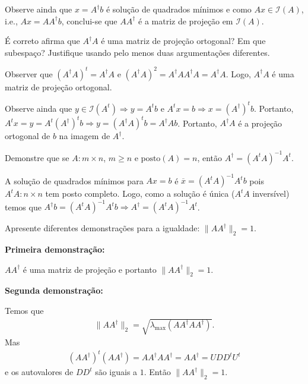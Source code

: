 \documentclass[a4paper,12pt, leqno, answers]{exam}
\begin{document}
\begin{questions}
\begin{solution}
        Observe ainda que $x = A^\dagger b$ \'{e} solu\c{c}\~{a}o de quadrados m\'{i}nimos e como $A x \in \mathcal{I}(A)$, i.e., $A x = A A^\dagger b$, conclui-se que $A A^\dagger$ \'{e} a matriz de proje\c{c}\~{a}o em $\mathcal{I}(A)$.
    \end{solution}

    \question \'{E} correto afirma que $A^\dagger A$ \'{e} uma matriz de proje\c{c}\~{a}o ortogonal? Em que subespa\c{c}o? Justifique usando pelo menos duas argumenta\c{c}\~{o}es diferentes.
    \begin{solution}
        Observer que $\left( A^\dagger A \right)^t = A^\dagger A$ e $\left( A^\dagger A \right)^2 = A^\dagger A A^\dagger A = A^\dagger A$. Logo, $A^\dagger A$ \'{e} uma matriz de proje\c{c}\~{a}o ortogonal.

        Observe ainda que $y \in \mathcal{I}(A^t) \Rightarrow y = A^t b$ e $A^t x = b \Rightarrow x = \left( A^\dagger \right)^t b$. Portanto, $A^t x = y = A^t \left( A^\dagger \right)^t b \Rightarrow y = \left( A^\dagger A \right)^t b = A^\dagger A b$. Portanto, $A^\dagger A$ \'{e} a proje\c{c}\~{a}o ortogonal de $b$ na imagem de $A^\dagger$.
    \end{solution}

    \question Demonstre que se $A : m \times n$, $m \geq n$ e $\textrm{posto}(A) = n$, ent\~{a}o $A^\dagger = (A^t A)^{-1} A^t$.
    \begin{solution}
        A solu\c{c}\~{a}o de quadrados m\'{i}nimos para $A x = b$ \'{e} $\overline{x} = \left( A^t A \right)^{-1} A^t b$ pois $A^t A : n \times n$ tem posto completo. Logo, como a solu\c{c}\~{a}o \'{e} \'{u}nica ($A^t A$ invers\'{i}vel) temos que $A^\dagger b = \left( A^t A \right)^{-1} A^t b \Rightarrow A^\dagger = \left( A^t A \right)^{-1} A^t$.
    \end{solution}

    \question Apresente diferentes demonstra\c{c}\~{o}es para a igualdade: $\| A A^\dagger \|_2 = 1$.
    \begin{solution}
        \textbf{Primeira demonstra\c{c}\~{a}o:}

        $A A^\dagger$ \'{e} uma matriz de proje\c{c}\~{a}o e portanto $\| A A^\dagger \|_2 = 1$.

        \textbf{Segunda demonstra\c{c}\~{a}o:}

        Temos que
        \begin{align*}
            \| A A^\dagger \|_2 = \sqrt{\lambda_{\max}(A A^\dagger A A^\dagger)}.
        \end{align*}
        Mas
        \begin{align*}
            \left( A A^\dagger \right)^t \left( A A^\dagger \right) = A A^\dagger A A^\dagger = A A^\dagger = U D D^t U^t
        \end{align*}
        e os autovalores de $D D^t$ s\~{a}o iguais a $1$. Ent\~{a}o $\| A A^\dagger \|_2 = 1$.
    \end{solution}


\end{questions}
\end{document}
